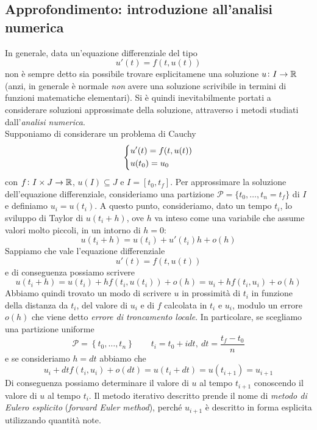 \subsection{Approfondimento: introduzione all'analisi numerica}
In generale, data un'equazione differenziale del tipo
\[
u'(t) = f(t,u(t))
\]
non è sempre detto sia possibile trovare esplicitamene una soluzione $u\colon I \to \amsbb{R}$ (anzi, in generale è normale \emph{non} avere una soluzione scrivibile in termini di funzioni matematiche elementari). Si è quindi inevitabilmente portati a considerare soluzioni approssimate della soluzione, attraverso i metodi studiati dall'\emph{analisi numerica}. \\
Supponiamo di considerare un problema di Cauchy
\[
\begin{dcases}
    u'(t) = f(t,u(t))\\
    u(t_0) = u_0
\end{dcases}
\]
con $f\colon I \times J \to \amsbb{R}$, $u(I)\subseteq J$ e $I=[t_0, t_f]$. Per approssimare la soluzione dell'equazione differenziale, consideriamo una partizione $\mathscr{P} = \{t_0, \dots, t_n = t_f\}$ di $I$ e definiamo $u_i = u(t_i)$. A questo punto, consideriamo, dato un tempo $t_i$, lo sviluppo di Taylor di $u(t_i+h)$, ove $h$ va inteso come una variabile che assume valori molto piccoli, in un intorno di $h=0$:
\[
u(t_i+h) = u(t_i) + u'(t_i)h + o(h)
\]
Sappiamo che vale l'equazione differenziale
\[
u'(t) = f(t,u(t))
\]
e di conseguenza possiamo scrivere
\[
u(t_i+h) = u(t_i)+ h f(t_i, u(t_i)) +o(h) = u_i +hf(t_i, u_i)+o(h)
\]
Abbiamo quindi trovato un modo di scrivere $u$ in prossimità di $t_i$ in funzione della distanza da $t_i$, del valore di $u_i$ e di $f$ calcolata in $t_i$ e $u_i$, modulo un errore $o(h)$ che viene detto \emph{errore di troncamento locale}. In particolare, se scegliamo una partizione uniforme
\[
\mathscr{P} = \left\{t_0, \dots, t_n\right\} \qquad t_i = t_0+idt, \ dt =\frac{t_f-t_0}{n}
\]
e se consideriamo $h=dt$ abbiamo che
\[
u_i + dt f(t_i, u_i) +o(dt) = u(t_i+dt) = u(t_{i+1}) = u_{i+1}
\]
Di conseguenza possiamo determinare il valore di $u$ al tempo $t_{i+1}$ conoscendo il valore di $u$ al tempo $t_i$. Il metodo iterativo descritto prende il nome di \emph{metodo di Eulero esplicito} (\emph{forward Euler method}), perché $u_{i+1}$ è descritto in forma esplicita utilizzando quantità note.
